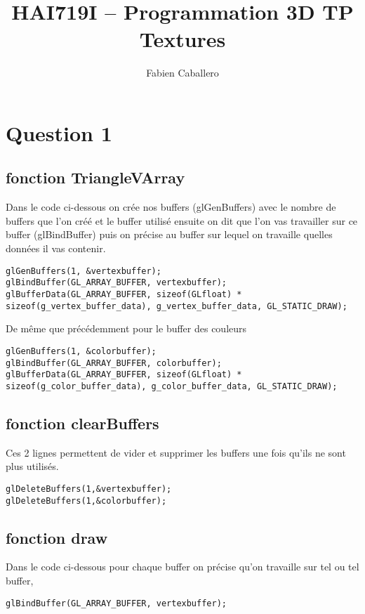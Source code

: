 \documentclass{article}
\title{HAI719I – Programmation 3D TP Textures}
\author{Fabien Caballero }
\begin{document}
\maketitle
    \tableofcontents


\newpage
\section{Question 1}
\subsection{fonction TriangleVArray}
Dans le code ci-dessous on crée nos buffers (glGenBuffers) avec le nombre de buffers que l’on créé et le buffer utilisé
ensuite on dit que l’on vas travailler sur ce buffer (glBindBuffer)
puis on précise au buffer sur lequel on travaille quelles données il vas contenir.

\begin{lstlisting}
glGenBuffers(1, &vertexbuffer);
glBindBuffer(GL_ARRAY_BUFFER, vertexbuffer);
glBufferData(GL_ARRAY_BUFFER, sizeof(GLfloat) * sizeof(g_vertex_buffer_data), g_vertex_buffer_data, GL_STATIC_DRAW);

\end{lstlisting}

De même que précédemment pour le buffer des couleurs

\begin{lstlisting}
glGenBuffers(1, &colorbuffer);
glBindBuffer(GL_ARRAY_BUFFER, colorbuffer);
glBufferData(GL_ARRAY_BUFFER, sizeof(GLfloat) * sizeof(g_color_buffer_data), g_color_buffer_data, GL_STATIC_DRAW);
\end{lstlisting}

\subsection{fonction clearBuffers }
Ces 2 lignes permettent de vider et supprimer les buffers une fois qu’ils ne sont plus utilisés.

\begin{lstlisting}
glDeleteBuffers(1,&vertexbuffer);
glDeleteBuffers(1,&colorbuffer);
\end{lstlisting}

\subsection{fonction draw }


Dans le code ci-dessous pour chaque buffer on précise qu’on travaille sur tel ou tel buffer,
\begin{lstlisting}
glBindBuffer(GL_ARRAY_BUFFER, vertexbuffer);
\end{lstlisting}
\end{document}
